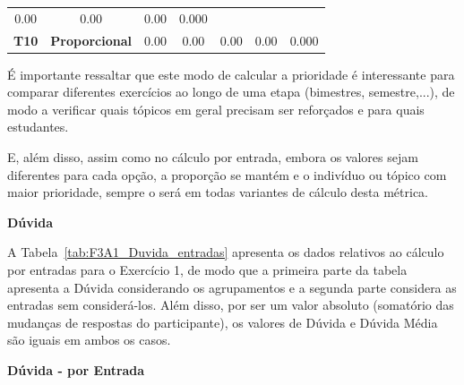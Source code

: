 \begin{table}[htbp]
\begin{tabular}{|c|cccccc|}
		\multicolumn{1}{c|}{0.00} &
		\multicolumn{1}{c|}{0.00} &
		\multicolumn{1}{c|}{0.00} &
		0.000 \\ \cline{2-7} 
		\multirow{-2}{*}{\textbf{T10}} &
		\multicolumn{1}{l|}{\cellcolor[HTML]{F2F2F2}\textbf{Proporcional}} &
		\multicolumn{1}{c|}{\cellcolor[HTML]{F2F2F2}0.00} &
		\multicolumn{1}{c|}{\cellcolor[HTML]{F2F2F2}0.00} &
		\multicolumn{1}{c|}{\cellcolor[HTML]{F2F2F2}0.00} &
		\multicolumn{1}{c|}{\cellcolor[HTML]{F2F2F2}0.00} &
		\cellcolor[HTML]{F2F2F2}0.000 \\ \hline
	\end{tabular}
	\label{tab:F3_P_casos_comagrupamento}
\end{table}

É importante ressaltar que este modo de calcular a prioridade é interessante para comparar diferentes exercícios ao longo de uma etapa (bimestres, semestre,...), de modo a verificar quais tópicos em geral precisam ser reforçados e para quais estudantes.

E, além disso, assim como no cálculo por entrada, embora os valores sejam diferentes para cada opção, a proporção se mantém e o indivíduo ou tópico com maior prioridade, sempre o será em todas variantes de cálculo desta métrica.


\textbf{Dúvida}

A Tabela~\ref{tab:F3A1_Duvida_entradas} apresenta os dados relativos ao cálculo por entradas para o Exercício 1, de modo que a primeira parte da tabela apresenta a Dúvida considerando os agrupamentos e a segunda parte considera as entradas sem considerá-los. Além disso, por ser um valor absoluto (somatório das mudanças de respostas do participante), os valores de Dúvida e Dúvida Média são iguais em ambos os casos.

\textbf{Dúvida - por Entrada}

